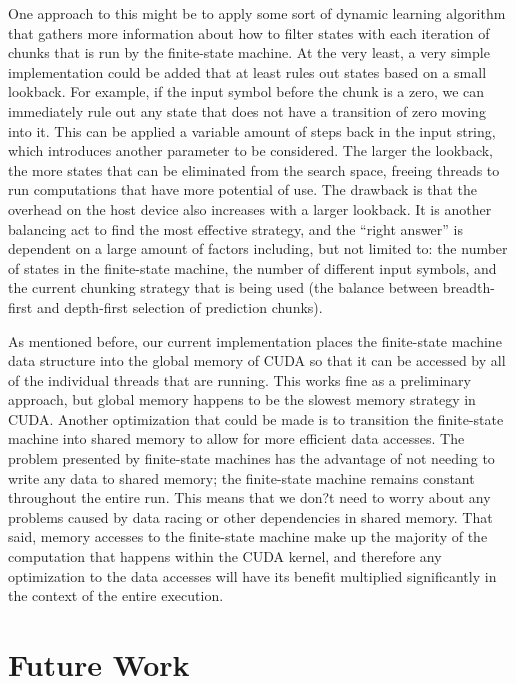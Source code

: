 \documentclass[11pt]{sigplanconf}
\begin{document}
One approach to this might be to apply some sort of dynamic learning algorithm that gathers more information about how to filter states with each iteration of chunks that is run by the finite-state machine. At the very least, a very simple implementation could be added that at least rules out states based on a small lookback. For example, if the input symbol before the chunk is a zero, we can immediately rule out any state that does not have a transition of zero moving into it. This can be applied a variable amount of steps back in the input string, which introduces another parameter to be considered. The larger the lookback, the more states that can be eliminated from the search space, freeing threads to run computations that have more potential of use. The drawback is that the overhead on the host device also increases with a larger lookback. It is another balancing act to find the most effective strategy, and the ``right answer'' is dependent on a large amount of factors including, but not limited to: the number of states in the finite-state machine, the number of different input symbols, and the current chunking strategy that is being used (the balance between breadth-first and depth-first selection of prediction chunks).

As mentioned before, our current implementation places the finite-state machine data structure into the global memory of CUDA so that it can be accessed by all of the individual threads that are running. This works fine as a preliminary approach, but global memory happens to be the slowest memory strategy in CUDA. Another optimization that could be made is to transition the finite-state machine into shared memory to allow for more efficient data accesses. The problem presented by finite-state machines has the advantage of not needing to write any data to shared memory; the finite-state machine remains constant throughout the entire run. This means that we don?t need to worry about any problems caused by data racing or other dependencies in shared memory. That said, memory accesses to the finite-state machine make up the majority of the computation that happens within the CUDA kernel, and therefore any optimization to the data accesses will have its benefit multiplied significantly in the context of the entire execution.
	
\section{Future Work}
\end{document}
